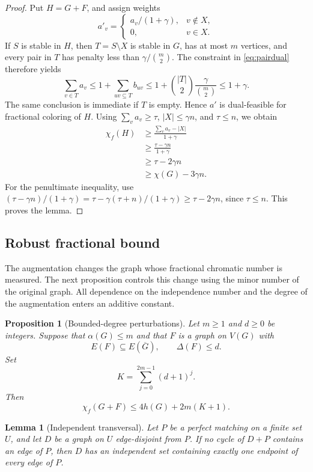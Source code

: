 \documentclass[11pt]{article}
\newtheorem{lemma}[theorem]{Lemma}
\newtheorem{proposition}[theorem]{Proposition}
\begin{document}
\begin{proof}
Put \(H=G+F\), and assign weights \[
a'_v=
\begin{cases}
a_v/(1+\gamma),&v\notin X,\\
0,&v\in X.
\end{cases}
\] If \(S\) is stable in \(H\), then \(T=S\setminus X\) is stable in \(G\), has at most
 \(m\) vertices, and every pair in \(T\) has penalty less than
 \(\gamma/\binom m2\). The
 constraint in \eqref{eq:pairdual} therefore yields \[
\sum_{v\in T}a_v\le1+\sum_{uv\subseteq T}b_{uv}
 \le1+\binom{|T|}{2}\frac{\gamma}{\binom m2}
 \le1+\gamma.
\] The same conclusion is immediate if \(T\) is empty. Hence \(a'\) is dual-feasible for
 fractional coloring of \(H\). Using \(\sum_v a_v\ge\tau\), \(|X|\le\gamma n\), and
 \(\tau\le n\), we obtain \[
\begin{aligned}
\chi_f(H)
&\ge\frac{\sum_v a_v-|X|}{1+\gamma}\\
&\ge\frac{\tau-\gamma n}{1+\gamma}\\
&\ge\tau-2\gamma n\\
&\ge\chi(G)-3\gamma n
.
\end{aligned}
\]
For the penultimate inequality, use
$(\tau-\gamma n)/(1+\gamma)
=\tau-\gamma(\tau+n)/(1+\gamma)\ge\tau-2\gamma n$,
since $\tau\le n$. This proves the lemma. \end{proof}

\subsection{Robust fractional bound}

The augmentation changes the graph whose fractional chromatic number is measured. The
 next proposition controls this change using the minor number of the original graph. All
 dependence on the independence number and the degree of the augmentation enters an
 additive constant.

\begin{proposition}[Bounded-degree perturbations]\label{prop:robust} Let \(m\ge1\) and
 \(d\ge0\) be integers. Suppose that \(\alpha(G)\le m\) and that \(F\) is a graph on
 \(V(G)\) with \[
E(F)\subseteq E(\overline G),\qquad \Delta(F)\le d.
\] Set \[
K=\sum_{j=0}^{2m-1}(d+1)^j.
\] Then \begin{equation}\label{eq:robust}
\chi_f(G+F)\le4h(G)+2m(K+1).
\end{equation} \end{proposition}

\begin{lemma}[Independent transversal]\label{lem:transversal} Let \(P\) be a perfect
 matching on a finite set \(U\), and let \(D\) be a graph on \(U\) edge-disjoint from
 \(P\). If no cycle of \(D+P\) contains an edge of \(P\), then \(D\) has an independent
 set containing exactly one endpoint of every edge of \(P\).

\end{lemma}
\end{document}
